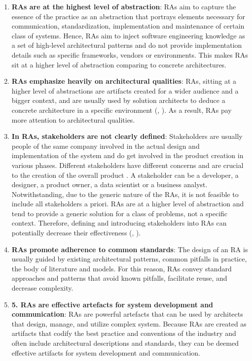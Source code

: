 \documentclass[review]{elsarticle}
\begin{document}
\begin{enumerate}
    \item \textbf{RAs are at the highest level of abstraction}: RAs aim to capture the essence of the practice as an abstraction that portrays elements necessary for communication, standardization, implementation and maintenance of certain class of systems. Hence, RAs aim to inject software engineering knowledge as a set of high-level architectural patterns and do not provide implementation details such as specific frameworks, vendors or environments. This makes RAs sit at a higher level of abstraction comparing to concrete architectures.  
   \item \textbf{RAs emphasize heavily on architectural qualities}: RAs, sitting at a higher level of abstractions are artifacts created for a wider audience and a bigger context, and are usually used by solution architects to deduce a concrete architecture in a specific environment (\cite{angelov2008towards}, \cite{stricker2010creating}). As a result, RAs pay more attention to architectural qualities.
   \item \textbf{In RAs, stakeholders are not clearly defined}: Stakeholders are usually people of the same company involved in the actual design and implementation of the system and do get involved in the product creation in various phases. Different stakeholders have different concerns and are crucial to the creation of the overall product \cite{geerdink2013reference}. A stakeholder can be a developer, a designer, a product owner, a data scientist or a business analyst. Notwithstanding, due to the generic nature of the RAs, it is not feasible to include all stakeholders a priori. RAs are at a higher level of abstraction and tend to provide a generic solution for a class of problems, not a specific context. Therefore, defining and introducing stakeholders into RAs can potentially decrease their effectiveness (\cite{AtaeiACIS}, \cite{Chang}).
   \item \textbf{RAs promote adherence to common standards}: The design of an RA is usually guided by existing architectural patterns, common pitfalls in practice, the body of literature and models. For this reason, RAs convey standard approaches and patterns that avoid known pitfalls, facilitate reuse, and decrease complexity. 
   \item \textbf{5.	RAs are effective artefacts for system development and communication}: RAs are powerful artefacts that can be used by architects that design, manage, and utilize complex system. Because RAs are created as artifacts that codify the best practice and conventions of the industry and often include architectural descriptions and standards, they can be deemed effective artifacts for system development and communication. 
\end{enumerate}
\end{document}
